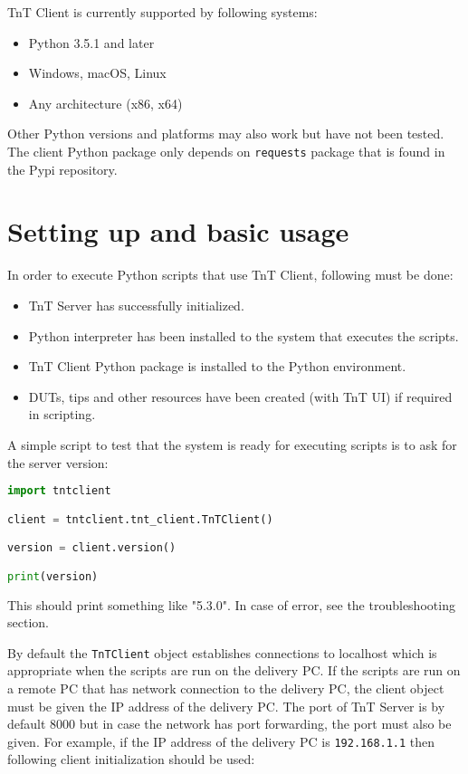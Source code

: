 TnT Client is currently supported by following systems:

\begin{itemize}
\item Python 3.5.1 and later
\item Windows, macOS, Linux
\item Any architecture (x86, x64)
\end{itemize}

Other Python versions and platforms may also work but have not been tested. The client Python package only depends on \texttt{requests} package that is found in the Pypi repository.

\section{Setting up and basic usage}

In order to execute Python scripts that use TnT Client, following must be done:

\begin{itemize}
\item TnT Server has successfully initialized.
\item Python interpreter has been installed to the system that executes the scripts.
\item TnT Client Python package is installed to the Python environment.
\item DUTs, tips and other resources have been created (with TnT UI) if required in scripting.
\end{itemize}

A simple script to test that the system is ready for executing scripts is to ask for the server version:

\begin{lstlisting}[language=Python]
import tntclient

client = tntclient.tnt_client.TnTClient()

version = client.version()

print(version)
\end{lstlisting}

This should print something like "5.3.0". In case of error, see the troubleshooting section.

By default the \texttt{TnTClient} object establishes connections to localhost which is appropriate when the scripts are run on the delivery PC. If the scripts are run on a remote PC that has network connection to the delivery PC, the client object must be given the IP address of the delivery PC. The port of TnT Server is by default 8000 but in case the network has port forwarding, the port must also be given. For example, if the IP address of the delivery PC is \texttt{192.168.1.1} then following client initialization should be used:

